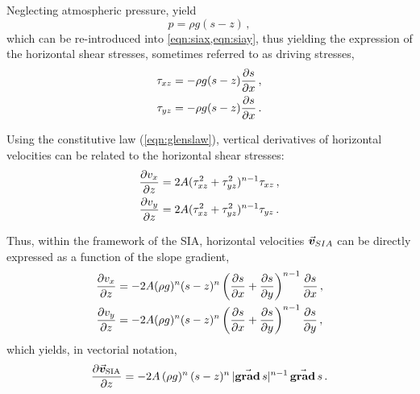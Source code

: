 \documentclass{article}
\newcommand{\vect}[1]{\va*{#1}} %
\renewcommand{\grad}[1]{\vect{\mathrm{grad}}\,#1}   %
\newcommand{\vv}[0]{\vect{v}}           %
\newcommand{\vsia}[0]{\vv_{\mathrm{SIA}}}   %
\begin{document}
Neglecting atmospheric pressure,  yield
\begin{equation}
    p = \rho g (s-z) \,,
\end{equation}
which can be re-introduced into \cref{eqn:siax,eqn:siay}, thus yielding the
expression of the horizontal shear stresses, sometimes referred to as driving
stresses,
\begin{subequations}
\begin{align}
    \tau_{xz} &= -\rho g (s-z) \pdv{s}{x} \,, \\
    \tau_{yz} &= -\rho g (s-z) \pdv{s}{x} \,.
\end{align}
\end{subequations}

Using the constitutive law (\ref{eqn:glenslaw}), vertical derivatives of
horizontal velocities can be related to the horizontal shear stresses:
\begin{subequations}
\begin{align}
    \pdv{v_x}{z} &= 2A (\tau_{xz}^2 + \tau_{yz}^2)^{n-1} \tau_{xz} \,, \\
    \pdv{v_y}{z} &= 2A (\tau_{xz}^2 + \tau_{yz}^2)^{n-1} \tau_{yz} \,.
\end{align}
\end{subequations}

Thus, within the framework of the SIA, horizontal velocities $\vv_{SIA}$ can be
directly expressed as a function of the slope gradient,
\begin{subequations}
\begin{align}
    \pdv{v_x}{z} &= -2A (\rho g)^n (s-z)^n
                    \left(\pdv{s}{x}+\pdv{s}{y}\right)^{n-1} \pdv{s}{x} \,, \\
    \pdv{v_y}{z} &= -2A (\rho g)^n (s-z)^n
                    \left(\pdv{s}{x}+\pdv{s}{y}\right)^{n-1} \pdv{s}{y} \,,
\end{align}
\end{subequations}
which yields, in vectorial notation,
\begin{equation}
    \label{eqn:vsia}
    \pdv{\vsia}{z} = -2A\,(\rho g)^n\,(s-z)^n\,|\grad{s}|^{n-1}\,\grad{s} \,.
\end{equation}
\end{document}
